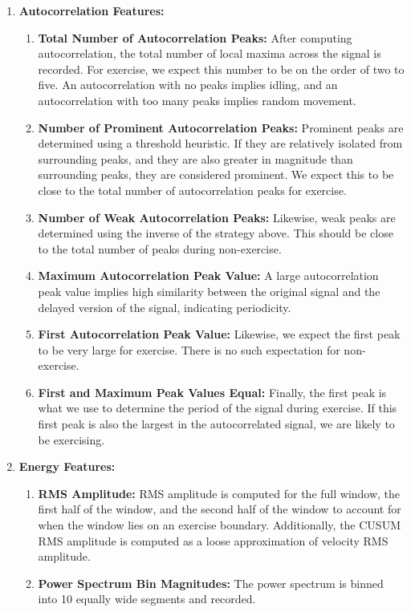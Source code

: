 \begin{enumerate}
    \item \textbf{Autocorrelation Features:}
    \begin{enumerate}
        \item \textbf{Total Number of Autocorrelation Peaks:} After computing autocorrelation, the total number of local maxima across the signal is recorded. For exercise, we expect this number to be on the order of two to five. An autocorrelation with no peaks implies idling, and an autocorrelation with too many peaks implies random movement.
        \item \textbf{Number of Prominent Autocorrelation Peaks:} Prominent peaks are determined using a threshold heuristic. If they are relatively isolated from surrounding peaks, and they are also greater in magnitude than surrounding peaks, they are considered prominent. We expect this to be close to the total number of autocorrelation peaks for exercise.
        \item \textbf{Number of Weak Autocorrelation Peaks:} Likewise, weak peaks are determined using the inverse of the strategy above. This should be close to the total number of peaks during non-exercise.
        \item \textbf{Maximum Autocorrelation Peak Value:} A large autocorrelation peak value implies high similarity between the original signal and the delayed version of the signal, indicating periodicity.
        \item \textbf{First Autocorrelation Peak Value:} Likewise, we expect the first peak to be very large for exercise. There is no such expectation for non-exercise.
        \item \textbf{First and Maximum Peak Values Equal:} Finally, the first peak is what we use to determine the period of the signal during exercise. If this first peak is also the largest in the autocorrelated signal, we are likely to be exercising.
    \end{enumerate}        
    \item \textbf{Energy Features:}
    \begin{enumerate}
        \item \textbf{RMS Amplitude:} RMS amplitude is computed for the full window, the first half of the window, and the second half of the window to account for when the window lies on an exercise boundary. Additionally, the CUSUM RMS amplitude is computed as a loose approximation of velocity RMS amplitude.
        \item \textbf{Power Spectrum Bin Magnitudes:} The power spectrum is binned into 10 equally wide segments and recorded. 

\end{enumerate}
\end{enumerate}
